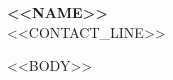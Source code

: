\documentclass[10pt, letterpaper]{article}
\begin{document}
\begin{center}
    {\Huge \textbf{<<NAME>>}} \\
    \vspace{6pt}
    {\small <<CONTACT_LINE>>}
\end{center}

\vspace{10pt}

<<BODY>>
\end{document}
